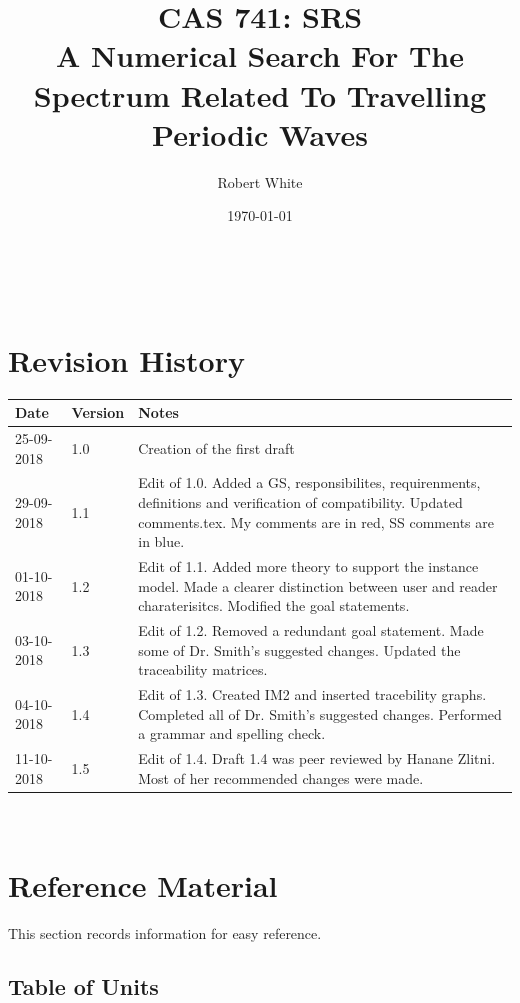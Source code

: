 \documentclass[12pt]{article}
\begin{document}
\title{CAS 741: SRS \\A Numerical Search For The Spectrum Related To Travelling 
Periodic Waves} 
\author{Robert White}
\date{\today}
	
\maketitle

~\newpage


\section{Revision History}

\begin{tabularx}{\textwidth}{p{3cm}p{2cm}X}
\toprule {\bf Date} & {\bf Version} & {\bf Notes}\\
\midrule
25-09-2018 & 1.0 & Creation of the first draft\\
29-09-2018 & 1.1 & Edit of 1.0. Added a GS, responsibilites, requirenments, 
definitions and verification of compatibility. Updated comments.tex. My 
comments are in red, SS comments are in blue.\\ 
01-10-2018 & 1.2 & Edit of 1.1. Added more theory to support the instance 
model. Made a clearer distinction between user and reader charaterisitcs. 
Modified the goal statements.  \\ 
03-10-2018 & 1.3 & Edit of 1.2. Removed a redundant goal statement. Made some 
of Dr. 
Smith's suggested changes. Updated the traceability matrices.  \\
04-10-2018 & 1.4 & Edit of 1.3. Created IM2 and inserted tracebility graphs. 
Completed all of Dr. Smith's suggested changes. Performed a grammar and 
spelling check.\\ 
11-10-2018 & 1.5& Edit of 1.4. Draft 1.4 was peer reviewed by Hanane Zlitni. 
Most of her recommended changes were made. \\
\bottomrule
\end{tabularx}

~\newpage

\section{Reference Material}

This section records information for easy reference.

\subsection{Table of Units}
\end{document}
